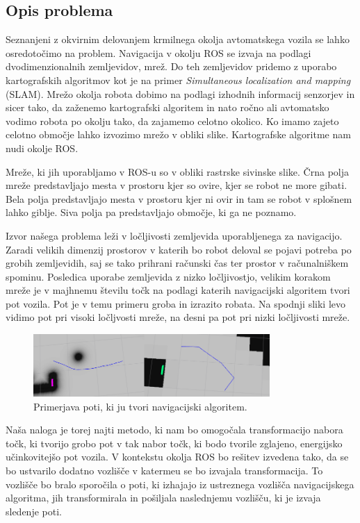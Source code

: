 \documentclass[final,5p,times,twocolumn]{elsarticle}
\begin{document}
\subsection{Opis problema}

Seznanjeni z okvirnim delovanjem krmilnega okolja avtomatskega vozila se lahko osredotočimo na problem. Navigacija v okolju ROS se izvaja na podlagi dvodimenzionalnih zemljevidov, mrež. Do teh zemljevidov pridemo z uporabo kartografskih algoritmov kot je na primer \textit{Simultaneous localization and mapping} (SLAM). Mrežo okolja robota dobimo na podlagi izhodnih informacij senzorjev in sicer tako, da zaženemo kartografski algoritem in nato ročno ali avtomatsko vodimo robota po okolju tako, da zajamemo celotno okolico. Ko imamo zajeto celotno območje lahko izvozimo mrežo v obliki slike. Kartografske algoritme nam nudi okolje ROS. 

Mreže, ki jih uporabljamo v ROS-u so v obliki rastrske sivinske slike. Črna polja mreže predstavljajo mesta v prostoru kjer so ovire, kjer se robot ne more gibati. Bela polja predstavljajo mesta v prostoru kjer ni ovir in tam se robot v splošnem lahko giblje. Siva polja pa predstavljajo območje, ki ga ne poznamo.

Izvor našega problema leži v ločljivosti zemljevida uporabljenega za navigacijo. Zaradi velikih dimenzij prostorov v katerih bo robot deloval se pojavi potreba po grobih zemljevidih, saj se tako prihrani računski čas ter prostor v računalniškem spominu. Posledica uporabe zemljevida z nizko ločljivostjo, velikim korakom mreže je v majhnemu številu točk na podlagi katerih navigacijski algoritem tvori pot vozila. Pot je v temu primeru groba in izrazito robata. Na spodnji sliki levo vidimo pot pri visoki ločljvosti mreže, na desni pa pot pri nizki ločljivosti mreže.
\begin{figure}[H]
	\centering
	\includegraphics[width=9cm]{slika3.png}
	\caption{Primerjava poti, ki ju tvori navigacijski algoritem.}
	\label{fig:slika}
\end{figure}
Naša naloga je torej najti metodo, ki nam bo omogočala transformacijo nabora točk, ki tvorijo grobo pot v tak nabor točk, ki bodo tvorile zglajeno, energijsko učinkovitejšo pot vozila. V kontekstu okolja ROS bo rešitev izvedena tako, da se bo ustvarilo dodatno vozlišče v katermeu se bo izvajala transformacija. To vozlišče bo bralo sporočila o poti, ki izhajajo iz ustreznega vozlišča navigacijskega algoritma, jih transformirala in pošiljala naslednjemu vozlišču, ki je izvaja sledenje poti.
\end{document}
